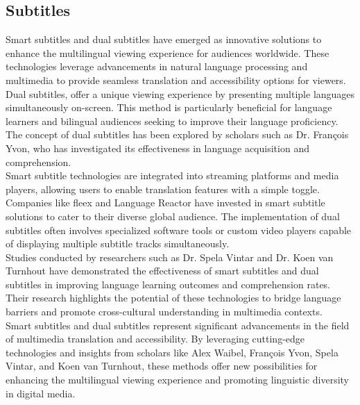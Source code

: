 \documentclass[12pt]{article}
\begin{document}
\subsection{Subtitles}
Smart subtitles and dual subtitles have emerged as innovative solutions to enhance the multilingual viewing experience for audiences worldwide. These technologies leverage advancements in natural language processing and multimedia to provide seamless translation and accessibility options for viewers. \\
Dual subtitles, offer a unique viewing experience by presenting multiple languages simultaneously on-screen. This method is particularly beneficial for language learners and bilingual audiences seeking to improve their language proficiency. The concept of dual subtitles has been explored by scholars such as Dr. François Yvon, who has investigated its effectiveness in language acquisition and comprehension.\\
Smart subtitle technologies are integrated into streaming platforms and media players, allowing users to enable translation features with a simple toggle. Companies like fleex and Language Reactor have invested in smart subtitle solutions to cater to their diverse global audience. The implementation of dual subtitles often involves specialized software tools or custom video players capable of displaying multiple subtitle tracks simultaneously. \\
Studies conducted by researchers such as Dr. Spela Vintar and Dr. Koen van Turnhout have demonstrated the effectiveness of smart subtitles and dual subtitles in improving language learning outcomes and comprehension rates. Their research highlights the potential of these technologies to bridge language barriers and promote cross-cultural understanding in multimedia contexts.\\
Smart subtitles and dual subtitles represent significant advancements in the field of multimedia translation and accessibility. By leveraging cutting-edge technologies and insights from scholars like Alex Waibel, François Yvon, Spela Vintar, and Koen van Turnhout, these methods offer new possibilities for enhancing the multilingual viewing experience and promoting linguistic diversity in digital media.
\end{document}
